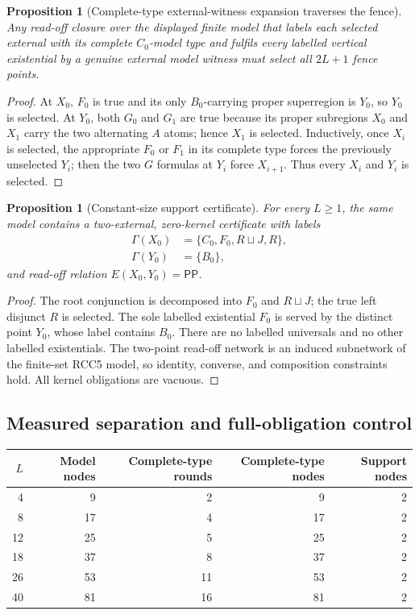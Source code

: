 \documentclass[11pt,letterpaper]{article}
\newcommand{\PP}{\ensuremath{\mathsf{PP}}}
\theoremstyle{definition}
\theoremstyle{plain}
\newtheorem{proposition}[definition]{Proposition}
\theoremstyle{remark}
\begin{document}
\begin{proposition}[Complete-type external-witness expansion traverses the fence]
Any read-off closure over the displayed finite model that labels each selected
external with its complete $C_0$-model type and fulfils every labelled vertical
existential by a genuine external model witness must select all $2L+1$ fence
points.
\end{proposition}

\begin{proof}
At $X_0$, $F_0$ is true and its only $B_0$-carrying proper superregion is
$Y_0$, so $Y_0$ is selected.  At $Y_0$, both $G_0$ and $G_1$ are true because
its proper subregions $X_0$ and $X_1$ carry the two alternating $A$ atoms; hence
$X_1$ is selected.  Inductively, once $X_i$ is selected, the appropriate
$F_0$ or $F_1$ in its complete type forces the previously unselected $Y_i$;
then the two $G$ formulas at $Y_i$ force $X_{i+1}$.  Thus every $X_i$ and $Y_i$
is selected.
\end{proof}

\begin{proposition}[Constant-size support certificate]\label{prop:two-node}
For every $L\geq 1$, the same model contains a two-external, zero-kernel
certificate with labels
\[
\begin{aligned}
\Gamma(X_0)&=\{C_0,F_0,R\sqcup J,R\},\\
\Gamma(Y_0)&=\{B_0\},
\end{aligned}
\]
and read-off relation $E(X_0,Y_0)=\PP$.
\end{proposition}

\begin{proof}
The root conjunction is decomposed into $F_0$ and $R\sqcup J$; the true
left disjunct $R$ is selected.  The sole labelled existential $F_0$ is served
by the distinct point $Y_0$, whose label contains $B_0$.  There are no labelled
universals and no other labelled existentials.  The two-point read-off network
is an induced subnetwork of the finite-set RCC5 model, so identity, converse,
and composition constraints hold.  All kernel obligations are vacuous.
\end{proof}

\subsection{Measured separation and full-obligation control}

\begin{center}
\begin{tabular}{rrrrr}
\toprule
$L$ & Model nodes & Complete-type rounds & Complete-type nodes & Support nodes \\
\midrule
4  & 9  & 2  & 9  & 2 \\
8  & 17 & 4  & 17 & 2 \\
12 & 25 & 5  & 25 & 2 \\
18 & 37 & 8  & 37 & 2 \\
26 & 53 & 11 & 53 & 2 \\
40 & 81 & 16 & 81 & 2 \\
\bottomrule
\end{tabular}
\end{center}
\end{document}
